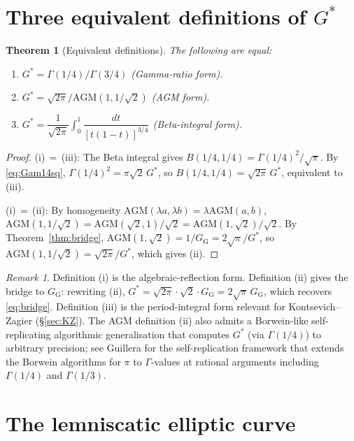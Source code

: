\documentclass[11pt]{article}
\newtheorem{theorem}{Theorem}[section]
\theoremstyle{definition}
\theoremstyle{remark}
\newtheorem*{remark}{Remark}
\newcommand{\Gs}{G^{*}}
\newcommand{\GG}{G_{\!\scriptscriptstyle\mathrm{G}}}
\newcommand{\AGM}{\mathrm{AGM}}
\begin{document}
\section{Three equivalent definitions of $\Gs$}\label{sec:eqdef}

\begin{theorem}[Equivalent definitions]\label{thm:equivalence}
The following are equal:
\begin{enumerate}[label=\textup{(\roman*)}, leftmargin=*]
\item $\Gs = \Gamma(1/4)/\Gamma(3/4)$ (Gamma-ratio form).
\item $\Gs = \sqrt{2\pi}/\AGM(1, 1/\sqrt 2)$ (AGM form).
\item $\Gs = \dfrac{1}{\sqrt{2\pi}}\int_0^1 \dfrac{dt}{[t(1-t)]^{3/4}}$
(Beta-integral form).
\end{enumerate}
\end{theorem}

\begin{proof}
(i)\,$=$\,(iii): The Beta integral gives $B(1/4, 1/4) = \Gamma(1/4)^2/\sqrt\pi$.
By \eqref{eq:Gam14sq}, $\Gamma(1/4)^2 = \pi\sqrt 2\,\Gs$, so
$B(1/4, 1/4) = \sqrt{2\pi}\,\Gs$, equivalent to (iii).

(i)\,$=$\,(ii): By homogeneity $\AGM(\lambda a, \lambda b) = \lambda\AGM(a,b)$,
$\AGM(1, 1/\sqrt 2) = \AGM(\sqrt 2, 1)/\sqrt 2 = \AGM(1,\sqrt 2)/\sqrt 2$.
By Theorem~\ref{thm:bridge}, $\AGM(1,\sqrt 2) = 1/\GG = 2\sqrt\pi/\Gs$, so
$\AGM(1, 1/\sqrt 2) = \sqrt{2\pi}/\Gs$, which gives (ii).
\end{proof}

\begin{remark}
Definition (i) is the algebraic-reflection form. Definition (ii) gives
the bridge to $\GG$: rewriting (ii),
$\Gs = \sqrt{2\pi} \cdot \sqrt 2 \cdot \GG = 2\sqrt\pi\,\GG$, which
recovers \eqref{eq:bridge}. Definition (iii) is the period-integral form
relevant for Kontsevich--Zagier (\S\ref{sec:KZ}). The AGM definition (ii)
also admits a Borwein-like self-replicating algorithmic generalisation
that computes $\Gs$ (via $\Gamma(1/4)$) to arbitrary precision; see
Guillera \cite{guillera-selfreplication} for the self-replication
framework that extends the Borwein algorithms for $\pi$
\cite{borweinAGM} to $\Gamma$-values at rational arguments including
$\Gamma(1/4)$ and $\Gamma(1/3)$.
\end{remark}

\section{The lemniscatic elliptic curve}\label{sec:lemniscatic}
\end{document}
